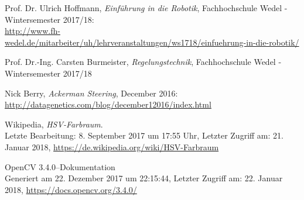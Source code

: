 \documentclass[a4paper,12pt]{report}
\begin{document}

\begin{thebibliography}{9}

	Prof. Dr. Ulrich Hoffmann,
	\textit{Einführung in die Robotik},
	Fachhochschule Wedel - Wintersemester 2017/18:\\
	\url{http://www.fh-wedel.de/mitarbeiter/uh/lehrveranstaltungen/ws1718/einfuehrung-in-die-robotik/}

	Prof. Dr.-Ing. Carsten Burmeister,
	\textit{Regelungstechnik},
	Fachhochschule Wedel - Wintersemester 2017/18

	Nick Berry,
	\textit{Ackerman Steering},
	December 2016:\\
	\url{http://datagenetics.com/blog/december12016/index.html}

	Wikipedia,
	\textit{HSV-Farbraum}.\\
	Letzte Bearbeitung: 8. September 2017 um 17:55 Uhr,
	Letzter Zugriff am: 21. Januar 2018,
	\url{https://de.wikipedia.org/wiki/HSV-Farbraum}
	
	OpenCV 3.4.0--Dokumentation\\
	Generiert am 22. Dezember 2017 um 22:15:44,
	Letzter Zugriff am: 22. Januar 2018,
	\url{https://docs.opencv.org/3.4.0/}

\end{thebibliography}
\end{document}
